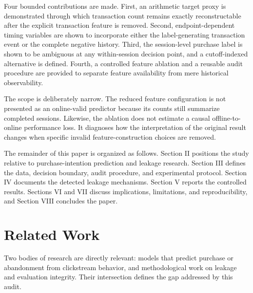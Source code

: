 \documentclass[conference, letterpaper]{IEEEtran}
\begin{document}
Four bounded contributions are made. First, an arithmetic target proxy is demonstrated through which transaction count remains exactly reconstructable after the explicit transaction feature is removed. Second, endpoint-dependent timing variables are shown to incorporate either the label-generating transaction event or the complete negative history. Third, the session-level purchase label is shown to be ambiguous at any within-session decision point, and a cutoff-indexed alternative is defined. Fourth, a controlled feature ablation and a reusable audit procedure are provided to separate feature availability from mere historical observability.

The scope is deliberately narrow. The reduced feature configuration is not presented as an online-valid predictor because its counts still summarize completed sessions. Likewise, the ablation does not estimate a causal offline-to-online performance loss. It diagnoses how the interpretation of the original result changes when specific invalid feature-construction choices are removed.

The remainder of this paper is organized as follows. Section II positions the study relative to purchase-intention prediction and leakage research. Section III defines the data, decision boundary, audit procedure, and experimental protocol. Section IV documents the detected leakage mechanisms. Section V reports the controlled results. Sections VI and VII discuss implications, limitations, and reproducibility, and Section VIII concludes the paper.

\section{Related Work}
Two bodies of research are directly relevant: models that predict purchase or abandonment from clickstream behavior, and methodological work on leakage and evaluation integrity. Their intersection defines the gap addressed by this audit.
\end{document}
